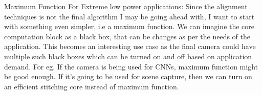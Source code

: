 Maximum Function For Extreme low power applications:
Since the alignment techniques is not the final algorithm I may be going ahead with, I want to start with something even simpler, i.e a maximum function. We can imagine the core computation block as a black box, that can be changes as per the needs of the application. This becomes an interesting use case as the final camera could have multiple such black boxes which can be turned on and off based on application demand. For eg. If the camera is being used for CNNs, maximum function might be good enough. If it’s going to be used for scene capture, then we can turn on an efficient stitching core instead of maximum function.





